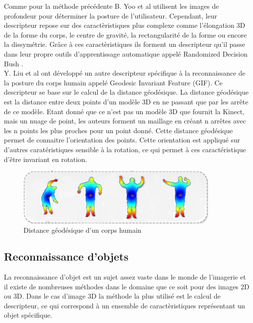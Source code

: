 Comme pour la méthode précédente B. Yoo et al\cite{RDB} utilisent les images de profondeur pour déterminer
la posture de l'utilisateur. Cependant, leur descripteur repose sur des caractèristiques plus complexe comme
l'élongation 3D de la forme du corps, le centre de gravité, la rectangularité de la forme ou encore la 
dissymétrie. Grâce à ces caractèristiques ils forment un descripteur qu'il passe dans leur propre outils
d'apprentissage automatique appelé \og Randomized Decision Bush \fg.\\

Y. Liu et al\cite{GIF} ont développé un autre descripteur spécifique à la reconnaissance de la posture du corps
humain appelé \og Geodesic Invariant Feature \fg(GIF). 
Ce descripteur se base sur le calcul de la distance géodésique. La distance géodésique est la distance
entre deux points d'un modèle 3D en ne passant que par les arrête de ce modèle. Etant donné que ce n'est pas un
modèle 3D que fournit la Kinect, mais un nuage de point, les auteurs forment un maillage en créant n arrêtes avec
les n points les plus proches pour un point donné. Cette distance géodésique permet de connaitre l'orientation
des points. Cette orientation est appliqué sur d'autres caratéristiques sensible à la rotation, ce qui permet
à ces caractéristique d'être invariant en rotation. 

\begin{figure}[!h]
  \begin{center}
    \includegraphics[width=10cm]{image/geodesic.png}
    \caption{Distance géodésique d'un corps humain}
  \end{center}
\end{figure}

\subsection{Reconnaissance d'objets}
La reconnaissance d'objet est un sujet assez vaste dans le monde de l'imagerie et il existe de nombreuses
méthodes dans le domaine que ce soit pour des images 2D ou 3D. Dans le cas d'image 3D la méthode la plus utilisé
est le calcul de descripteur, ce qui correspond à un ensemble de caractèristiques représentant un objet spécifique.

